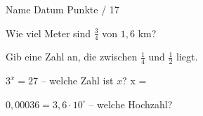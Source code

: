 \documentclass[11pt]{article}
\begin{document}
{}
\par\vspace{2pt}\noindent Name \underline{\hspace{7cm}}\hfill Datum \underline{\hspace{3cm}}\hfill Punkte \underline{\hspace{1.2cm}} / 17\par\vspace{6pt}
\small

\noindent\begin{minipage}[t]{0.485\linewidth}\raggedright
\begin{aufgabe}{Wie viel Meter sind $\frac{3}{4}$ von $1{,}6$ km? \leerfeld[m]}
\end{aufgabe}
\end{minipage}\hfill\begin{minipage}[t]{0.485\linewidth}\raggedright
\begin{aufgabe}{Gib eine Zahl an, die zwischen $\frac{1}{4}$ und $\frac{1}{2}$ liegt. \leerfeld}
\end{aufgabe}
\end{minipage}\par

\noindent\begin{minipage}[t]{0.485\linewidth}\raggedright
\begin{aufgabe}{$3^x = 27$ – welche Zahl ist $x$? x = \leerfeld}
\end{aufgabe}
\end{minipage}\hfill\begin{minipage}[t]{0.485\linewidth}\raggedright
\begin{aufgabe}{$0{,}00036 = 3{,}6 \cdot 10^{\square}$ – welche Hochzahl? \leerfeld}
\end{aufgabe}
\end{minipage}\par
\end{document}
